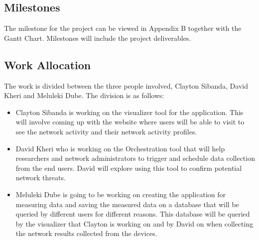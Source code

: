\subsection{Milestones}
The milestone for the project can be viewed in Appendix B together with the Gantt Chart. Milestones will include the project deliverables.
\subsection{Work Allocation}
The work is divided between the three people involved, Clayton Sibanda, David Kheri and Meluleki Dube. The division is as follows:
\begin{itemize}
	\item Clayton Sibanda is working on the visualizer tool for the application. This will involve coming up with the website where users will be able to visit to see the network activity and their network activity profiles.
	\item David Kheri who is working on the Orchestration tool that will help researchers and network administrators to trigger and schedule data collection from the end users. David will explore using this tool to confirm potential network threats.
	\item  Meluleki Dube is going to be working on creating the application for measuring data and saving the measured data on a database that will be queried by different users for different reasons. This database will be queried by the visualizer that Clayton is working on and by David on when collecting the network results collected from the devices.
\end{itemize}
